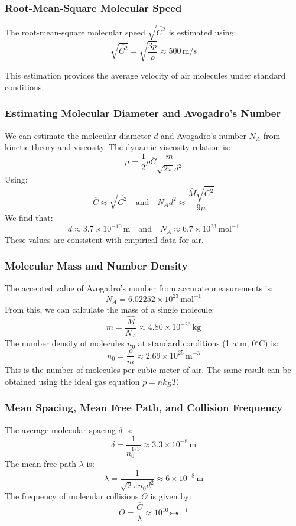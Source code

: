 \documentclass{beamer}
\begin{document}
\begin{frame}
\frametitle{Root-Mean-Square Molecular Speed}

The root-mean-square molecular speed $\sqrt{\overline{C^2}}$ is estimated using:
\[
\sqrt{\overline{C^2}} = \sqrt{\frac{3p}{\rho}} \approx 500 \, \text{m/s}
\]

This estimation provides the average velocity of air molecules under standard conditions.
\end{frame}

\begin{frame}
\frametitle{Estimating Molecular Diameter and Avogadro's Number}

We can estimate the molecular diameter $d$ and Avogadro's number $N_A$ from kinetic theory and viscosity. The dynamic viscosity relation is:
\[
\mu = \frac{1}{2} \rho \overline{C} \frac{m}{\sqrt{2\pi} d^2}
\]
Using:
\[
\overline{C} \approx \sqrt{\overline{C^2}} \quad \text{and} \quad N_A d^2 \approx \frac{\hat{M} \sqrt{\overline{C^2}}}{9 \mu}
\]
We find that:
\[
d \approx 3.7 \times 10^{-10} \, \text{m} \quad \text{and} \quad N_A \approx 6.7 \times 10^{23} \, \text{mol}^{-1}
\]
These values are consistent with empirical data for air.
\end{frame}


\begin{frame}
\frametitle{Molecular Mass and Number Density}

The accepted value of Avogadro's number from accurate measurements is:
\[
N_A = 6.02252 \times 10^{23} \, \text{mol}^{-1}
\]
From this, we can calculate the mass of a single molecule:
\[
m = \frac{\hat{M}}{N_A} \approx 4.80 \times 10^{-26} \, \text{kg}
\]
The number density of molecules $n_0$ at standard conditions (1 atm, 0$^\circ$C) is:
\[
n_0 = \frac{\rho}{m} \approx 2.69 \times 10^{25} \, \text{m}^{-3}
\]
This is the number of molecules per cubic meter of air. The same result can be obtained using the ideal gas equation $p = n k_B T$.
\end{frame}

\begin{frame}
\frametitle{Mean Spacing, Mean Free Path, and Collision Frequency}

The average molecular spacing $\delta$ is:
\[
\delta = \frac{1}{n_0^{1/3}} \approx 3.3 \times 10^{-8} \, \text{m}
\]
The mean free path $\lambda$ is:
\[
\lambda = \frac{1}{\sqrt{2} \pi n_0 d^2} \approx 6 \times 10^{-8} \, \text{m}
\]
The frequency of molecular collisions $\Theta$ is given by:
\[
\Theta = \frac{\overline{C}}{\lambda} \approx 10^{10} \, \text{sec}^{-1}
\]
\end{frame}
\end{document}

